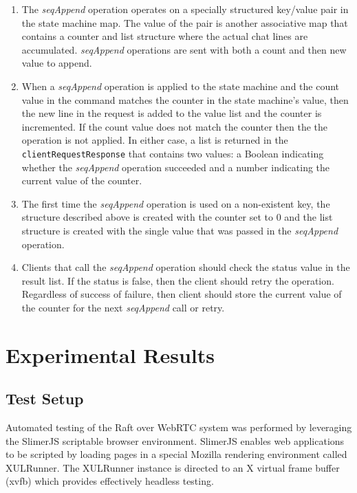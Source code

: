 \documentclass[conference,compsoc]{./IEEEtran/IEEEtran}
\begin{document}
\begin{enumerate}
\item The \emph{seqAppend} operation operates on a specially structured key/value pair in the state machine map. The value of the pair is another associative map that contains a counter and list structure where the actual chat lines are accumulated. \emph{seqAppend} operations are sent with both a count and then new value to append.
\item When a \emph{seqAppend} operation is applied to the state machine and the count value in the command matches the counter in the state machine's value, then the new line in the request is added to the value list and the counter is incremented. If the count value does not match the counter then the the operation is not applied. In either case, a list is returned in the \texttt{clientRequestResponse} that contains two values: a Boolean indicating whether the \emph{seqAppend} operation succeeded and a number indicating the current value of the counter.
\item The first time the \emph{seqAppend} operation is used on a non-existent key, the structure described above is created with the counter set to 0 and the list structure is created with the single value that was passed in the \emph{seqAppend} operation.\
\item Clients that call the \emph{seqAppend} operation should check the status value in the result list. If the status is false, then the client should retry the operation. Regardless of success of failure, then client should store the current value of the counter for the next \emph{seqAppend} call or retry.
\end{enumerate}

\section{Experimental Results}

\subsection{Test Setup}

Automated testing of the Raft over WebRTC system was performed by leveraging the SlimerJS scriptable browser environment. SlimerJS enables web applications to be scripted by loading pages in a special Mozilla rendering environment called XULRunner. The XULRunner instance is directed to an X virtual frame buffer (xvfb) which provides effectively headless testing.
\end{document}
